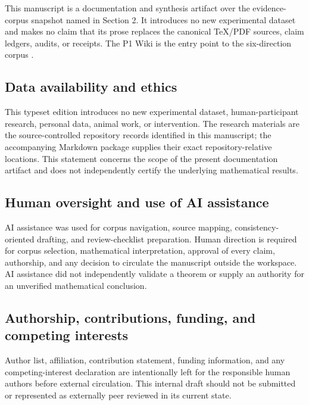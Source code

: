 This manuscript is a documentation and synthesis artifact over the evidence-corpus snapshot named in Section 2. It introduces no new experimental dataset and makes no claim that its prose replaces the canonical TeX/PDF sources, claim ledgers, audits, or receipts. The P1 Wiki is the entry point to the six-direction corpus .

\hypertarget{data-availability-and-ethics}{%
\subsection{Data availability and ethics}\label{data-availability-and-ethics}}

This typeset edition introduces no new experimental dataset, human-participant research, personal data, animal work, or intervention. The research materials are the source-controlled repository records identified in this manuscript; the accompanying Markdown package supplies their exact repository-relative locations. This statement concerns the scope of the present documentation artifact and does not independently certify the underlying mathematical results.

\hypertarget{human-oversight-and-use-of-ai-assistance}{%
\subsection{Human oversight and use of AI assistance}\label{human-oversight-and-use-of-ai-assistance}}

AI assistance was used for corpus navigation, source mapping, consistency-oriented drafting, and review-checklist preparation. Human direction is required for corpus selection, mathematical interpretation, approval of every claim, authorship, and any decision to circulate the manuscript outside the workspace. AI assistance did not independently validate a theorem or supply an authority for an unverified mathematical conclusion.

\hypertarget{authorship-funding-and-competing-interests}{%
\subsection{Authorship, contributions, funding, and competing interests}\label{authorship-funding-and-competing-interests}}

Author list, affiliation, contribution statement, funding information, and any competing-interest declaration are intentionally left for the responsible human authors before external circulation. This internal draft should not be submitted or represented as externally peer reviewed in its current state.

